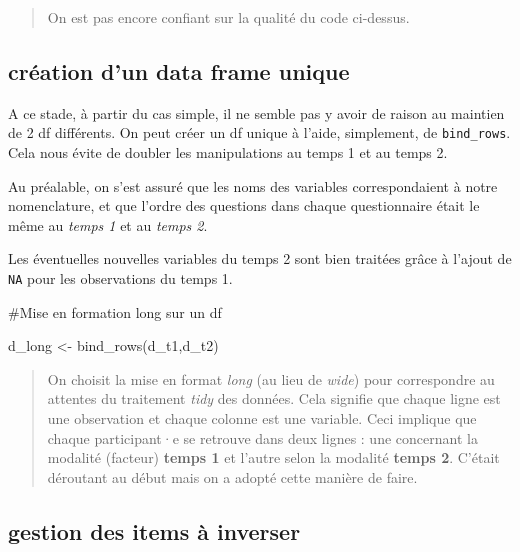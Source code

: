 \documentclass[
  letterpaper,
  DIV=11,
  numbers=noendperiod]{scrreprt}
\newenvironment{Shaded}{\begin{snugshade}}{\end{snugshade}}
\newcommand{\CommentTok}[1]{\textcolor[rgb]{0.37,0.37,0.37}{#1}}
\newcommand{\FunctionTok}[1]{\textcolor[rgb]{0.28,0.35,0.67}{#1}}
\newcommand{\NormalTok}[1]{\textcolor[rgb]{0.00,0.23,0.31}{#1}}
\newcommand{\OtherTok}[1]{\textcolor[rgb]{0.00,0.23,0.31}{#1}}
\begin{document}
\begin{quote}
On est pas encore confiant sur la qualité du code ci-dessus.
\end{quote}

\hypertarget{cruxe9ation-dun-data-frame-unique}{%
\subsection{création d'un data frame
unique}\label{cruxe9ation-dun-data-frame-unique}}

A ce stade, à partir du cas simple, il ne semble pas y avoir de raison
au maintien de 2 df différents. On peut créer un df unique à l'aide,
simplement, de \texttt{bind\_rows}. Cela nous évite de doubler les
manipulations au temps 1 et au temps 2.

Au préalable, on s'est assuré que les noms des variables correspondaient
à notre nomenclature, et que l'ordre des questions dans chaque
questionnaire était le même au \emph{temps 1} et au \emph{temps 2}.

Les éventuelles nouvelles variables du temps 2 sont bien traitées grâce
à l'ajout de \texttt{NA} pour les observations du temps 1.

\begin{Shaded}
\begin{Highlighting}[]
\CommentTok{\#Mise en formation long sur un df}

\NormalTok{d\_long }\OtherTok{\textless{}{-}} \FunctionTok{bind\_rows}\NormalTok{(d\_t1,d\_t2)}
\end{Highlighting}
\end{Shaded}

\begin{quote}
On choisit la mise en format \emph{long} (au lieu de \emph{wide}) pour
correspondre au attentes du traitement \emph{tidy} des données. Cela
signifie que chaque ligne est une observation et chaque colonne est une
variable. Ceci implique que chaque participant·e se retrouve dans deux
lignes : une concernant la modalité (facteur) \textbf{temps 1} et
l'autre selon la modalité \textbf{temps 2}. C'était déroutant au début
mais on a adopté cette manière de faire.
\end{quote}

\hypertarget{gestion-des-items-uxe0-inverser}{%
\subsection{gestion des items à
inverser}\label{gestion-des-items-uxe0-inverser}}
\end{document}
